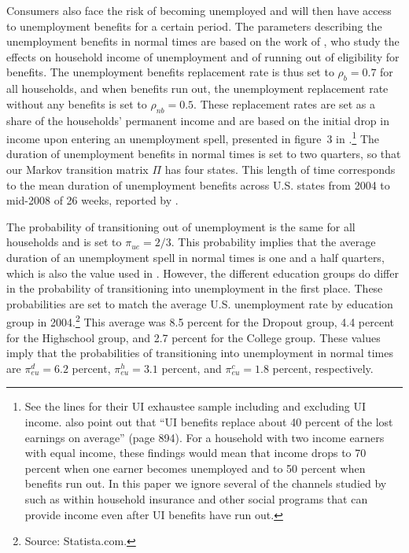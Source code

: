 \documentclass[../HAFiscal]{subfiles}
\begin{document}
Consumers also face the risk of becoming unemployed and will then have access to unemployment benefits for a certain period. The parameters describing the unemployment benefits in normal times are based on the work of \cite{rothstein2017scraping}, who study the effects on household income of unemployment and of running out of eligibility for benefits. The unemployment benefits replacement rate is thus set to $\rho_b=0.7$ for all households, and when benefits run out, the unemployment replacement rate without any benefits is set to $\rho_{nb}=0.5$. These replacement rates are set as a share of the households' permanent income and are based on the initial drop in income upon entering an unemployment spell, presented in figure~3 in \cite{rothstein2017scraping}.\footnote{See the lines for their UI exhaustee sample including and excluding UI income. \cite{rothstein2017scraping} also point out that ``UI benefits replace about 40 percent of the lost earnings on average'' (page 894). For a household with two income earners with equal income, these findings would mean that income drops to 70 percent when one earner becomes unemployed and to 50 percent when benefits run out. In this paper we ignore several of the channels studied by \cite{rothstein2017scraping} such as within household insurance and other social programs that can provide income even after UI benefits have run out.} The duration of unemployment benefits in normal times is set to two quarters, so that our Markov transition matrix $\Pi$ has four states. This length of time corresponds to the mean duration of unemployment benefits across U.S. states from 2004 to mid-2008 of 26 weeks, reported by \cite{rothstein2017scraping}. 

The probability of transitioning out of unemployment is the same for all households and is set to $\pi_{ue}=2/3$. This probability implies that the average duration of an unemployment spell in normal times is one and a half quarters, which is also the value used in \cite{carroll2020modeling}. However, the different education groups do differ in the probability of transitioning into unemployment in the first place. These probabilities are set to match the average U.S. unemployment rate by education group in 2004.\footnote{Source: Statista.com.} This average was 8.5 percent for the Dropout group, 4.4 percent for the Highschool group, and 2.7 percent for the College group. These values imply that the probabilities of transitioning into unemployment in normal times are $\pi_{eu}^d=6.2$ percent, $\pi_{eu}^h=3.1$ percent, and $\pi_{eu}^c=1.8$ percent, respectively. 
\end{document}
